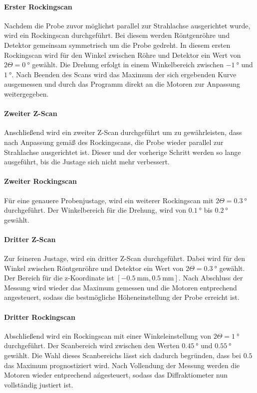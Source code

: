 \paragraph{Erster Rockingscan}
Nachdem die Probe zuvor möglichst parallel zur Strahlachse ausgerichtet wurde,
wird ein Rockingscan durchgeführt. Bei diesem werden Röntgenröhre und
Detektor gemeinsam symmetrisch um die Probe gedreht. In diesem ersten
Rockingscan wird für den Winkel zwischen Röhre und Detektor ein Wert von
$2\Theta = \SI{0}{\degree}$ gewählt. Die Drehung erfolgt in einem Winkelbereich
zwischen $\SI{-1}{\degree}$ und $\SI{1}{\degree}$. Nach Beenden des Scans wird
das Maximum der sich ergebenden Kurve ausgemessen und durch das Programm direkt
an die Motoren zur Anpassung weitergegeben.


\paragraph{Zweiter Z-Scan}
Anschließend wird ein zweiter Z-Scan durchgeführt um zu gewährleisten, dass
nach Anpassung gemäß des Rockingscans, die Probe wieder parallel zur Strahlachse
ausgerichtet ist. Dieser und der vorherige Schritt werden so lange ausgeführt,
bis die Justage sich nicht mehr
verbessert.



\paragraph{Zweiter Rockingscan}
Für eine genauere Probenjustage, wird ein weiterer Rockingscan mit
$2\Theta = \SI{0.3}{\degree}$ durchgeführt. Der Winkelbereich für die Drehung,
wird von $\SI{0.1}{\degree}$ bis $\SI{0.2}{\degree}$ gewählt.


\paragraph{Dritter Z-Scan}
Zur feineren Justage, wird ein dritter Z-Scan durchgeführt.
Dabei wird für den Winkel zwischen Röntgenröhre und Detektor ein Wert von
$2\Theta = \SI{0.3}{\degree}$ gewählt. Der Bereich für die z-Koordinate
ist $[\SI{-0.5}{\milli\meter}, \SI{0.5}{\milli\meter}]$.
Nach Abschluss der Messung wird wieder das Maximum gemessen und
die Motoren entprechend angesteuert, sodass die bestmögliche Höheneinstellung
der Probe erreicht ist.


\paragraph{Dritter Rockingscan}
Abschließend wird ein Rockingscan mit einer Winkeleinstellung von
$2\Theta = \SI{1}{\degree}$ durchgeführt. Der Scanbereich wird zwischen den Werten
$\SI{0.45}{\degree}$ und $\SI{0.55}{\degree}$ gewählt. Die Wahl dieses Scanbereichs lässt sich dadurch begründen,
dass bei $0.5$ das Maximum prognostiziert wird. Nach Vollendung der Messung
werden die Motoren wieder entprechend ańgesteuert, sodass das Diffraktiometer
nun vollständig justiert ist.



